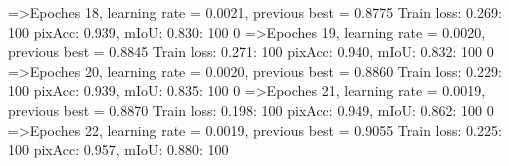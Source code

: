 =>Epoches 18, learning rate = 0.0021,                 previous best = 0.8775
Train loss: 0.269: 100%
pixAcc: 0.939, mIoU: 0.830: 100%
  0%
=>Epoches 19, learning rate = 0.0020,                 previous best = 0.8845
Train loss: 0.271: 100%
pixAcc: 0.940, mIoU: 0.832: 100%
  0%
=>Epoches 20, learning rate = 0.0020,                 previous best = 0.8860
Train loss: 0.229: 100%
pixAcc: 0.939, mIoU: 0.835: 100%
  0%
=>Epoches 21, learning rate = 0.0019,                 previous best = 0.8870
Train loss: 0.198: 100%
pixAcc: 0.949, mIoU: 0.862: 100%
  0%
=>Epoches 22, learning rate = 0.0019,                 previous best = 0.9055
Train loss: 0.225: 100%
pixAcc: 0.957, mIoU: 0.880: 100%
